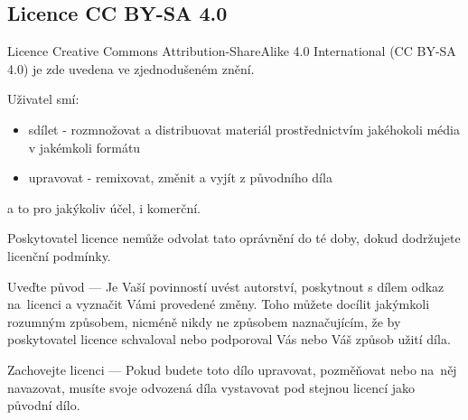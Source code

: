 \subsection{Licence CC BY-SA 4.0}
\label{licence CC BY-SA 4.0}
Licence Creative Commons Attribution-ShareAlike 4.0 International (CC BY-SA 4.0)
je zde uvedena ve zjednodušeném znění.

Uživatel smí:

\begin{itemize}
    \item   sdílet - rozmnožovat a distribuovat materiál prostřednictvím jakéhokoli média v jakémkoli formátu
    \item   upravovat - remixovat, změnit a vyjít z původního díla
\end{itemize}
a to pro jakýkoliv účel, i komerční.

Poskytovatel licence nemůže odvolat tato oprávnění do té doby, dokud dodržujete licenční podmínky.

Uveďte původ — Je Vaší povinností uvést autorství, poskytnout s dílem odkaz
na~licenci a vyznačit Vámi provedené změny. Toho můžete docílit jakýmkoli
rozumným způsobem, nicméně nikdy ne způsobem naznačujícím, že by poskytovatel
licence schvaloval nebo podporoval Vás nebo Váš způsob užití díla.

Zachovejte licenci — Pokud budete toto dílo upravovat, pozměňovat nebo
na~něj navazovat, musíte svoje odvozená díla vystavovat pod stejnou
licencí jako původní dílo.\cite{CCBYSA4}

